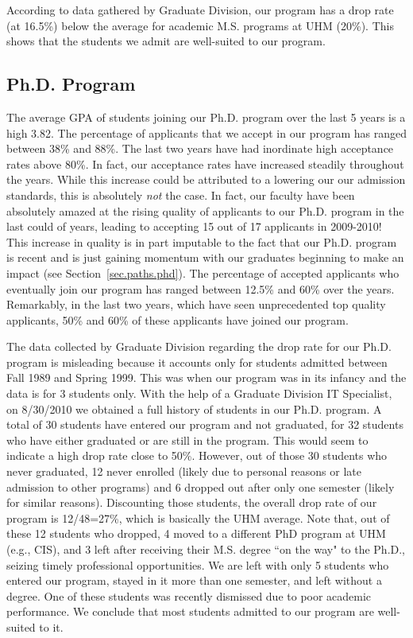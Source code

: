 \documentclass[12pt]{article}
\begin{document}
According to data gathered by Graduate Division, our program has a
drop rate (at 16.5\%) below the average for academic M.S. programs at
UHM (20\%). This shows that the students we admit are well-suited to
our program.


\subsection{Ph.D. Program}
\label{sec.apps.phd}

The average GPA of students joining our Ph.D. program over the last 5
years is a high 3.82. The percentage of applicants that we accept in
our program has ranged between 38\% and 88\%. The last two years have
had inordinate high acceptance rates above 80\%. In fact, our
acceptance rates have increased steadily throughout the years. While
this increase could be attributed to a lowering our our admission
standards, this is absolutely \emph{not} the case. In fact, our faculty have
been absolutely amazed at the rising quality of applicants to our
Ph.D. program in the last could of years, leading to accepting 15 out
of 17 applicants in 2009-2010! This increase in quality is in part
imputable to the fact that our Ph.D. program is recent and is just
gaining momentum with our graduates beginning to make an impact (see
Section~\ref{sec.paths.phd}).  The percentage of accepted applicants
who eventually join our program has ranged between 12.5\% and 60\%
over the years. Remarkably, in the last two years, which have seen
unprecedented top quality applicants, 50\%
and 60\% of these applicants have joined our program.

The data collected by Graduate Division regarding the drop rate for
our Ph.D. program is misleading because it
accounts only for students admitted between Fall 1989 and Spring 1999.
This was when our program was in its infancy and the data is 
for 3 students only.  With the help of a Graduate Division IT
Specialist, on 8/30/2010 we obtained a full history of students in our
Ph.D. program. A total of 30 students have entered our program and not
graduated, for 32 students who have either graduated or are still in
the program. This would seem to indicate a high drop rate close to
50\%. However, out of those 30 students who never graduated, 12 never
enrolled (likely due to personal reasons or late admission to other
programs) and 6 dropped out after only one semester (likely for
similar reasons). Discounting those students, the overall drop rate of
our program is 12/48=27\%, which is basically the UHM average.  Note
that, out of these 12 students who dropped, 4 moved to a different PhD
program at UHM (e.g., CIS), and 3 left after receiving their M.S.
degree ``on the way" to the Ph.D., seizing timely
professional opportunities.  We are left with only 5 students who
entered our program, stayed in it more than one semester, and left
without a degree. One of these students was recently dismissed due to
poor academic performance.  We conclude that most students admitted to
our program are well-suited to it.
\end{document}
